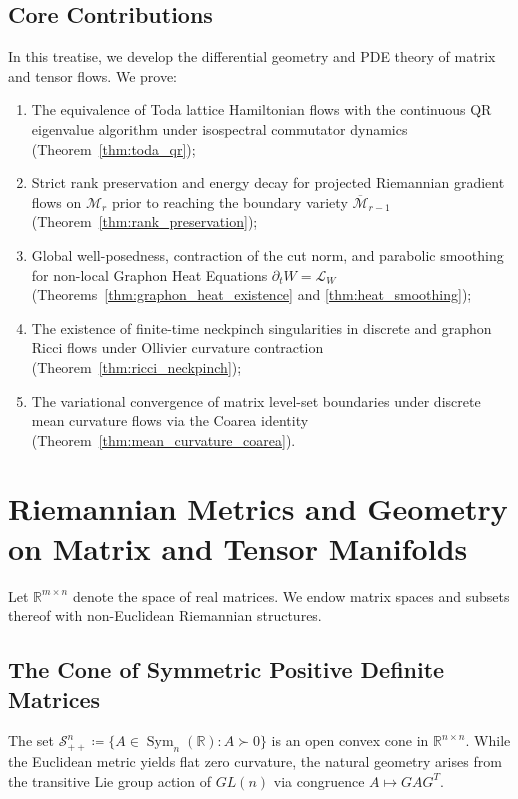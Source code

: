 \documentclass[11pt,a4paper,reqno]{amsart}
\theoremstyle{definition}
\numberwithin{equation}{section}
\newcommand{\R}{\mathbb{R}}
\begin{document}
\subsection*{Core Contributions}
In this treatise, we develop the differential geometry and PDE theory of matrix and tensor flows. We prove:
\begin{enumerate}[label=\arabic*.]
    \item The equivalence of Toda lattice Hamiltonian flows with the continuous QR eigenvalue algorithm under isospectral commutator dynamics (Theorem~\ref{thm:toda_qr});
    \item Strict rank preservation and energy decay for projected Riemannian gradient flows on $\mathcal{M}_r$ prior to reaching the boundary variety $\overline{\mathcal{M}}_{r-1}$ (Theorem~\ref{thm:rank_preservation});
    \item Global well-posedness, contraction of the cut norm, and parabolic smoothing for non-local Graphon Heat Equations $\partial_t W = \mathcal{L}_W$ (Theorems~\ref{thm:graphon_heat_existence} and \ref{thm:heat_smoothing});
    \item The existence of finite-time neckpinch singularities in discrete and graphon Ricci flows under Ollivier curvature contraction (Theorem~\ref{thm:ricci_neckpinch});
    \item The variational convergence of matrix level-set boundaries under discrete mean curvature flows via the Coarea identity (Theorem~\ref{thm:mean_curvature_coarea}).
\end{enumerate}

\section{Riemannian Metrics and Geometry on Matrix and Tensor Manifolds}
\label{sec:riemannian_geometry}

Let $\R^{m \times n}$ denote the space of real matrices. We endow matrix spaces and subsets thereof with non-Euclidean Riemannian structures.

\subsection{The Cone of Symmetric Positive Definite Matrices}
\label{subsec:cone_spd}
The set $\mathcal{S}_{++}^n \coloneqq \{A \in \operatorname{Sym}_n(\R) \colon A \succ 0\}$ is an open convex cone in $\R^{n \times n}$. While the Euclidean metric yields flat zero curvature, the natural geometry arises from the transitive Lie group action of $GL(n)$ via congruence $A \mapsto G A G^T$.
\end{document}
